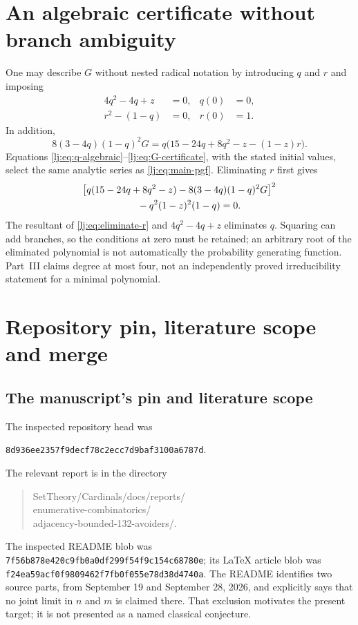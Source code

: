 \documentclass[11pt,a4paper]{article}
\theoremstyle{definition}\newaliascnt{definition}{theorem}
\theoremstyle{remark}\newaliascnt{remark}{theorem}
\begin{document}
\section{An algebraic certificate without branch ambiguity}
\label{lj:app:algebra}
One may describe $G$ without nested radical notation by introducing
$q$ and $r$ and imposing
\begin{align}
 4q^2-4q+z&=0, & q(0)&=0,\label{lj:eq:q-algebraic}\\
 r^2-(1-q)&=0, & r(0)&=1.\label{lj:eq:r-algebraic}
\end{align}
In addition,
\begin{equation}
 8(3-4q)(1-q)^2G
 =q\bigl(15-24q+8q^2-z-(1-z)r\bigr).
 \label{lj:eq:G-certificate}
\end{equation}
Equations \eqref{lj:eq:q-algebraic}--\eqref{lj:eq:G-certificate}, with the stated
initial values, select the same analytic series as \eqref{lj:eq:main-pgf}.
Eliminating $r$ first gives
\begin{align}
 &\bigl[q(15-24q+8q^2-z)
       -8(3-4q)(1-q)^2G\bigr]^2\notag\\
 &\hspace{2cm}-q^2(1-z)^2(1-q)=0.
 \label{lj:eq:eliminate-r}
\end{align}
The resultant of \eqref{lj:eq:eliminate-r} and $4q^2-4q+z$ eliminates $q$.
Squaring can add branches, so the conditions at zero must be retained;
an arbitrary root of the eliminated polynomial is not automatically the
probability generating function. Part~III claims degree at most four,
not an independently proved irreducibility statement for a minimal
polynomial.

\section{Repository pin, literature scope and merge}
\label{lj:app:provenance}

\subsection{The manuscript's pin and literature scope}
The inspected repository head was
\begin{center}
\texttt{8d936ee2357f9decf78c2ecc7d9baf3100a6787d}.
\end{center}
The relevant report is in the directory
\begin{quote}\small\ttfamily
SetTheory/Cardinals/docs/reports/\\
 enumerative-combinatorics/\\
 adjacency-bounded-132-avoiders/.
\end{quote}
The inspected README blob was
\texttt{7f56b878e420c9fb0a0df299f54f9c154c68780e}; its LaTeX article blob
was \texttt{f24ea59acf0f9809462f7fb0f055e78d38d4740a}.
The README identifies two source parts, from September 19 and September
28, 2026, and explicitly says that no joint limit in $n$ and $m$ is
claimed there. That exclusion motivates the present target; it is not
presented as a named classical conjecture.
\end{document}
